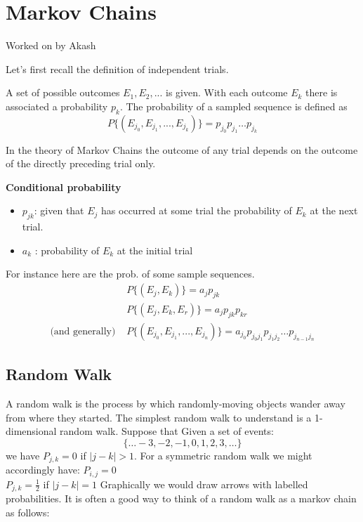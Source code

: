 \chapter{Markov Chains}

Worked on by Akash

Let's first recall the definition of independent trials.
\begin{definition}
A set of possible outcomes $E_1,E_2,...$ is given. With each outcome $E_k$ there is associated a probability $p_k$. The probability of a sampled sequence is defined as
$$ P\{(E_{j_0},E_{j_1},...,E_{j_k})\} = p_{j_0} p_{j_1} \hdots p_{j_k}$$
\end{definition}

\medskip
\noindent In the theory of Markov Chains the outcome of any trial depends on the outcome of the directly preceding trial only. 

\medskip
\noindent \textbf{Conditional probability}
\begin{itemize}
    \item $p_{jk}$: given that $E_j$ has occurred at some trial the probability of $E_k$ at the next trial.
    \item $a_k$ : probability of $E_k$ at the initial trial 
\end{itemize}
For instance here are the prob. of some sample sequences.
\begin{align*}
    &P\{(E_j,E_k)\} = a_j p_{jk}\\
    &P\{(E_j,E_k,E_r) \} = a_j p_{jk} p_{kr}\\
    \textrm{(and generally) }& P\{(E_{j_0},E_{j_1},...,E_{j_n})\} = a_{j_0} p_{j_0 j_1} p_{j_1 j_2} \hdots p_{j_{n-1} j_n}
\end{align*}

\section{Random Walk}
A random walk is the process by which randomly-moving objects wander away from where they started.
The simplest random walk to understand is a 1-dimensional random walk. Suppose that 
Given a set of events: 
$$ \{\dots -3, -2, -1, 0, 1, 2, 3, \dots\}$$
we have $P_{j,k} = 0$ if $ | j - k | > 1$. For a symmetric random walk we might accordingly have: $ P_{i, j} = 0$\\
$ P_{j, k} = \frac{1}{2}$ if $|j - k| = 1$
Graphically we would draw arrows with labelled probabilities. It is often a good way to think of a random walk as a markov chain as follows: 

